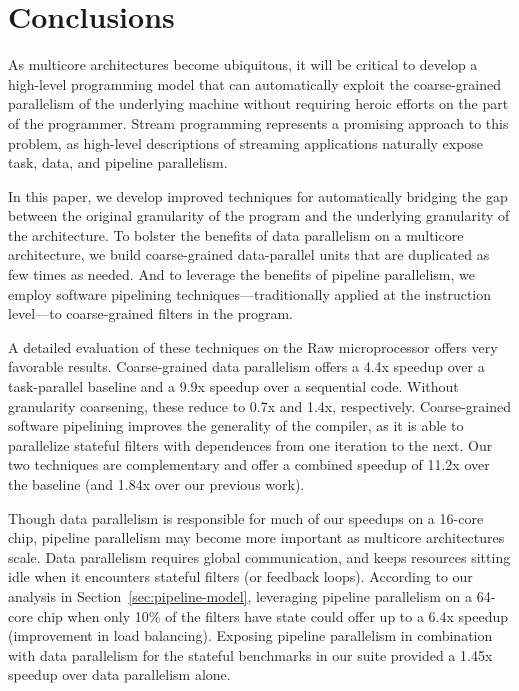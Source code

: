 \section{Conclusions}

As multicore architectures become ubiquitous, it will be critical to
develop a high-level programming model that can automatically exploit
the coarse-grained parallelism of the underlying machine without
requiring heroic efforts on the part of the programmer.  Stream
programming represents a promising approach to this problem, as
high-level descriptions of streaming applications naturally expose
task, data, and pipeline parallelism.  

In this paper, we develop improved techniques for automatically
bridging the gap between the original granularity of the program and
the underlying granularity of the architecture.  To bolster the
benefits of data parallelism on a multicore architecture, we build
coarse-grained data-parallel units that are duplicated as few times as
needed.  And to leverage the benefits of pipeline parallelism, we
employ software pipelining techniques---traditionally applied at the
instruction level---to coarse-grained filters in the program.

A detailed evaluation of these techniques on the Raw microprocessor
offers very favorable results.  Coarse-grained data parallelism offers
a 4.4x speedup over a task-parallel baseline and a 9.9x speedup over a
sequential code.  Without granularity coarsening, these reduce to 0.7x
and 1.4x, respectively.  Coarse-grained software pipelining improves
the generality of the compiler, as it is able to parallelize stateful
filters with dependences from one iteration to the next.  Our two
techniques are complementary and offer a combined speedup of 11.2x
over the baseline (and 1.84x over our previous work).

Though data parallelism is responsible for much of our speedups on a
16-core chip, pipeline parallelism may become more important as
multicore architectures scale.  Data parallelism requires global
communication, and keeps resources sitting idle when it encounters
stateful filters (or feedback loops).  According to our analysis in
Section~\ref{sec:pipeline-model}, leveraging pipeline parallelism on a 64-core
chip when only 10\% of the filters have state could offer up to a 6.4x
speedup (improvement in load balancing).  Exposing pipeline
parallelism in combination with data parallelism for the stateful
benchmarks in our suite provided a 1.45x speedup over data
parallelism alone.

